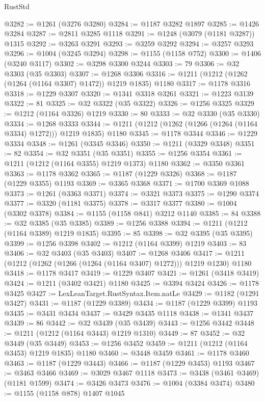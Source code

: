 \begin{lexlean}{RustStd}
\begin{coremodule}
@3282 := @1261 (@3276 @3280)
@3284 := @1187 @3282 @1897
@3285 := @1426 @3284
@3287 := @2811 @3285 @1118
@3291 := @1248 (@3079 (@1181 @3287)) @1315
@3292 := @3263 @3291
@3293 := @3259 @3292
@3294 := @3257 @3293
@3296 := @1004 (@3245 @3294)
@3298 := @1155 (@1158 @752)
@3300 := @1406 (@3240 @3117)
@3302 := @3298 @3300 @3244
@3303 := 79
@3306 := @32 @3303 (@35 @3303)
@3307 := @1268 @3306
@3316 := @1211 (@1212 (@1262 (@1264 (@1164 @3307) @1472)) @1219 @1835) @1180
@3317 := @1178 @3316
@3318 := @1229 @3307
@3320 := @1341 @3318 @3261
@3321 := @1223 @3139
@3322 := 81
@3325 := @32 @3322 (@35 @3322)
@3326 := @1256 @3325
@3329 := @1212 (@1164 @3326) @1219
@3330 := 80
@3333 := @32 @3330 (@35 @3330)
@3334 := @1268 @3333
@3344 := @1211 (@1212 (@1262 (@1266 (@1264 (@1164 @3334) @1272))) @1219 @1835) @1180
@3345 := @1178 @3344
@3346 := @1229 @3334
@3348 := @1261 (@3345 @3346)
@3350 := @1211 (@3329 @3348)
@3351 := 82
@3354 := @32 @3351 (@35 @3351)
@3355 := @1256 @3354
@3361 := @1211 (@1212 (@1164 @3355) @1219 @1373) @1180
@3362 := @3350 @3361
@3363 := @1178 @3362
@3365 := @1187 (@1229 @3326)
@3368 := @1187 (@1229 @3355) @1193
@3369 := @3365 @3368
@3371 := @1700 @3369 @1088
@3373 := @1261 (@3363 @3371)
@3374 := @3321 @3373
@3375 := @1290 @3374
@3377 := @3320 (@1181 @3375)
@3378 := @3317 @3377
@3380 := @1004 (@3302 @3378)
@3384 := @1155 (@1158 @841) @3212 @1140
@3385 := 84
@3388 := @32 @3385 (@35 @3385)
@3389 := @1256 @3388
@3394 := @1211 (@1212 (@1164 @3389) @1219 @1835)
@3395 := 85
@3398 := @32 @3395 (@35 @3395)
@3399 := @1256 @3398
@3402 := @1212 (@1164 @3399) @1219
@3403 := 83
@3406 := @32 @3403 (@35 @3403)
@3407 := @1268 @3406
@3417 := @1211 (@1212 (@1262 (@1266 (@1264 (@1164 @3407) @1272))) @1219 @1230) @1180
@3418 := @1178 @3417
@3419 := @1229 @3407
@3421 := @1261 (@3418 @3419)
@3424 := @1211 (@3402 @3421) @1180
@3425 := @3394 @3424
@3426 := @1178 @3425
@3427 := LexLeanTarget.RustSyntax.Item.natLe
@3429 := @1182 (@1291 @3427)
@3431 := @1187 (@1229 @3389)
@3434 := @1187 (@1229 @3399) @1193
@3435 := @3431 @3434
@3437 := @3429 @3435 @1118
@3438 := @1341 @3437
@3439 := 86
@3442 := @32 @3439 (@35 @3439)
@3443 := @1256 @3442
@3448 := @1211 (@1212 (@1164 @3443) @1219 @1310)
@3449 := 87
@3452 := @32 @3449 (@35 @3449)
@3453 := @1256 @3452
@3459 := @1211 (@1212 (@1164 @3453) @1219 @1835) @1180
@3460 := @3448 @3459
@3461 := @1178 @3460
@3463 := @1187 (@1229 @3443)
@3466 := @1187 (@1229 @3453) @1193
@3467 := @3463 @3466
@3469 := @3029 @3467 @1118
@3473 := @3438 (@3461 @3469) (@1181 @1599)
@3474 := @3426 @3473
@3476 := @1004 (@3384 @3474)
@3480 := @1155 (@1158 @878) @1407 @1045

\end{coremodule}
\end{lexlean}
